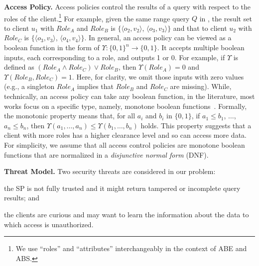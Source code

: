 \textbf{Access Policy.}
Access policies control the results of a query with respect to the roles of the client.\footnote{We use ``roles'' and ``attributes'' interchangeably in the context of ABE and ABS.}
For example, given the same range query $Q$ in , the result set to client $u_1$ with $Role_A$ and $Role_B$ is $\{\langle o_2, v_2\rangle$, $\langle o_3, v_3\rangle\}$ and that to client $u_2$ with $Role_C$ is $\{\langle o_3, v_3\rangle$, $\langle o_4, v_4\rangle\}$. In general, an access policy can be viewed as a boolean function in the form of $\Upsilon : {\{0, 1\}}^n \to \{0, 1\}$. It accepts multiple boolean inputs, each corresponding to a role, and outputs 1 or 0. For example, if $\Upsilon$ is defined as $({Role}_A \land {Role}_C) \lor {Role}_B$, then $\Upsilon({Role}_A) = 0$ and $\Upsilon({Role}_B, {Role}_C) = 1$. Here, for clarity, we omit those inputs with zero values (e.g., a singleton $Role_A$ implies that $Role_B$ and $Role_C$ are missing). While, technically, an access policy can take any boolean function, in the literature, most works focus on a specific type, namely, monotone boolean functions~\cite{10.1145/1180405.1180418,10.1109/sp.2007.11,10.1007/978-3-642-19074-2_24,10.1145/1755688.1755697}. Formally, the monotonic property means that, for all $a_i$ and $b_i$ in $\{0, 1\}$, if $a_1 \le b_1$, $\dots$, $a_n \le b_n$, then $\Upsilon(a_1, \dots, a_n) \le \Upsilon(b_1, \dots, b_n)$ holds. This property suggests that a client with more roles has a higher clearance level and so can access more data. %
For simplicity, we assume that all access control policies are monotone boolean functions that are normalized in a \emph{disjunctive normal form} (DNF).

\textbf{Threat Model.}
Two security threats are considered in our problem:
\begin{inlineenum}
\item the SP is not fully trusted and it might return tampered or incomplete query results; and
\item the clients are curious and may want to learn the information about the data to which  access is unauthorized.
\end{inlineenum}

